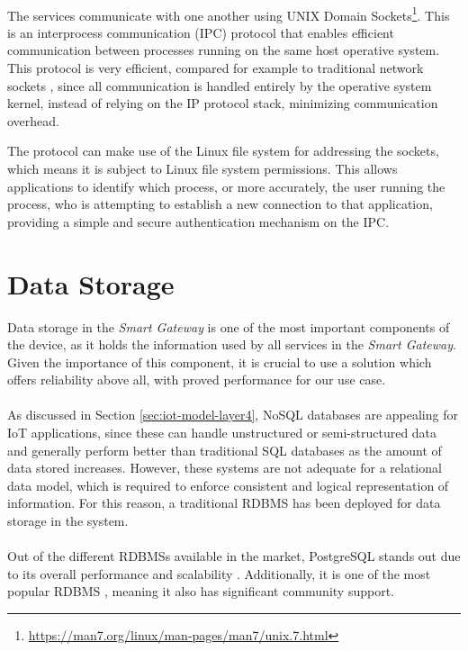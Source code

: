 \paragraph{} The services communicate with one another using UNIX Domain Sockets\footnote{\url{https://man7.org/linux/man-pages/man7/unix.7.html}}. This is an interprocess communication (\acs{IPC}) protocol that enables efficient communication between processes running on the same host operative system. This protocol is very efficient, compared for example to traditional network sockets \cite{Wright2007}, since all communication is handled entirely by the operative system kernel, instead of relying on the \acs{IP} protocol stack, minimizing communication overhead. 

The protocol can make use of the Linux file system for addressing the sockets, which means it is subject to Linux file system permissions. This allows applications to identify which process, or more accurately, the user running the process, who is attempting to establish a new connection to that application, providing a simple and secure authentication mechanism on the \acs{IPC}.

\section{Data Storage}

Data storage in the \textit{Smart Gateway} is one of the most important components of the device, as it holds the information used by all services in the \textit{Smart Gateway}. Given the importance of this component, it is crucial to use a solution which offers reliability above all, with proved performance for our use case.  

\paragraph{} As discussed in Section \ref{sec:iot-model-layer4}, No\acs{SQL} databases are appealing for \acs{IoT} applications, since these can handle unstructured or semi-structured data and generally perform better than traditional \acs{SQL} databases as the amount of data stored increases. However, these systems are not adequate for a relational data model, which is required to enforce consistent and logical representation of information. For this reason, a traditional \acf{RDBMS} has been deployed for data storage in the system.

\paragraph{} Out of the different \acs{RDBMS}s available in the market, PostgreSQL stands out due to its overall performance and scalability \cite{Asiminidis2018}. Additionally, it is one of the most popular \acs{RDBMS} \cite{dbengines}, meaning it also has significant community support. 

